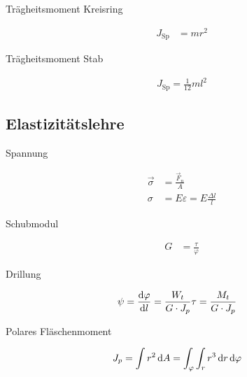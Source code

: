 \begin{boxleft}Trägheitsmoment Kreisring
\end{boxleft}\begin{boxrightshaded}
\begin{align}
J_\text{Sp}&=mr^2
\end{align}
\end{boxrightshaded}

\begin{boxleft}Trägheitsmoment Stab
\end{boxleft}\begin{boxrightshaded}
\begin{align}
J_\text{Sp}=\frac{1}{12}ml^2
\end{align}
\end{boxrightshaded}

\subsection{Elastizitätslehre}

\begin{boxleft}Spannung
\end{boxleft}\begin{boxrightshaded}
\begin{align}
\vec{\sigma}&=\frac{\vec{F}_n}{A}\\
\sigma&=E \varepsilon=E\frac{\Delta l}{l}
\end{align}
\end{boxrightshaded}

\begin{boxleft}Schubmodul
\end{boxleft}\begin{boxrightshaded}
\begin{align}
G&=\frac{\tau}{\varphi}
\end{align}
\end{boxrightshaded}

\begin{boxleft}Drillung
\end{boxleft}\begin{boxrightshaded}
\begin{align}
\psi&=\frac{\mathop{}\!\mathrm{d} \varphi}{\mathop{}\!\mathrm{d} l}=\frac{W_t}{G\cdot J_p}\tau=\frac{M_t}{G\cdot J_p}
\end{align}
\end{boxrightshaded}

\begin{boxleft}Polares Fläschenmoment
\end{boxleft}\begin{boxrightshaded}
\begin{align}
J_p&=\int r^2\mathop{}\!\mathrm{d} A=\int_\varphi\int_r r^3\mathop{}\!\mathrm{d} r \mathop{}\!\mathrm{d} \varphi 
\end{align}
\end{boxrightshaded}

